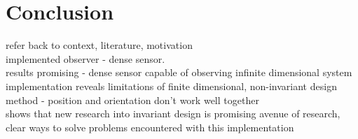 \chapter{Conclusion}
refer back to context, literature, motivation\\

implemented observer - dense sensor.\\
results promising - dense sensor capable of observing infinite dimensional system\\
implementation reveals limitations of finite dimensional, non-invariant design method - position and orientation don't work well together\\
shows that new research into invariant design is promising avenue of research, clear ways to solve problems encountered with this implementation
